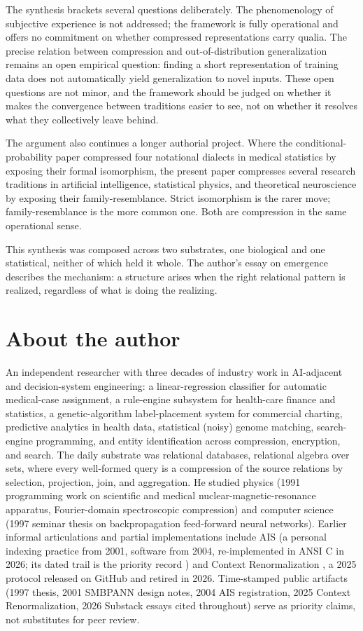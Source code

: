 \documentclass[11pt]{article}
\begin{document}
The synthesis brackets several questions deliberately. The phenomenology of subjective experience is not addressed; the framework is fully operational and offers no commitment on whether compressed representations carry qualia. The precise relation between compression and out-of-distribution generalization remains an open empirical question: finding a short representation of training data does not automatically yield generalization to novel inputs. These open questions are not minor, and the framework should be judged on whether it makes the convergence between traditions easier to see, not on whether it resolves what they collectively leave behind.

The argument also continues a longer authorial project. Where the conditional-probability paper \citep{gavrilov_conditional_2026} compressed four notational dialects in medical statistics by exposing their formal isomorphism, the present paper compresses several research traditions in artificial intelligence, statistical physics, and theoretical neuroscience by exposing their family-resemblance. Strict isomorphism is the rarer move; family-resemblance is the more common one. Both are compression in the same operational sense.

This synthesis was composed across two substrates, one biological and one statistical, neither of which held it whole. The author's essay on emergence \citep{gavrilov_emergence_2026} describes the mechanism: a structure arises when the right relational pattern is realized, regardless of what is doing the realizing.

\section*{About the author}
An independent researcher with three decades of industry work in AI-adjacent and decision-system engineering: a linear-regression classifier for automatic medical-case assignment, a rule-engine subsystem for health-care finance and statistics, a genetic-algorithm label-placement system for commercial charting, predictive analytics in health data, statistical (noisy) genome matching, search-engine programming, and entity identification across compression, encryption, and search. The daily substrate was relational databases, relational algebra over sets, where every well-formed query is a compression of the source relations by selection, projection, join, and aggregation. He studied physics (1991 programming work on scientific and medical nuclear-magnetic-resonance apparatus, Fourier-domain spectroscopic compression) and computer science (1997 seminar thesis on backpropagation feed-forward neural networks). Earlier informal articulations and partial implementations include AIS (a personal indexing practice from 2001, software from 2004, re-implemented in ANSI C in 2026; its dated trail is the priority record \citep{gavrilov_ais_priority_2026}) and Context Renormalization \citep{gavrilov_context_renorm_2026}, a 2025 protocol released on GitHub and retired in 2026. Time-stamped public artifacts (1997 thesis, 2001 SMBPANN design notes, 2004 AIS registration, 2025 Context Renormalization, 2026 Substack essays cited throughout) serve as priority claims, not substitutes for peer review.

\printbibliography[title={References}, notkeyword={self}]
\printbibliography[heading=none, keyword={self}]
\end{document}
